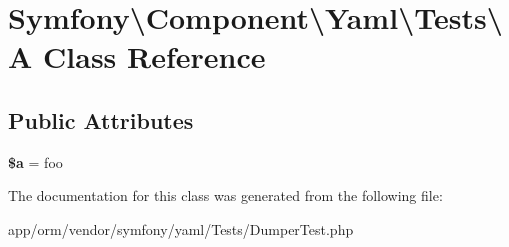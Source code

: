 \hypertarget{classSymfony_1_1Component_1_1Yaml_1_1Tests_1_1A}{}\section{Symfony\textbackslash{}Component\textbackslash{}Yaml\textbackslash{}Tests\textbackslash{}A Class Reference}
\label{classSymfony_1_1Component_1_1Yaml_1_1Tests_1_1A}
\subsection*{Public Attributes}
\begin{DoxyCompactItemize}
\item 
{\bfseries \$a} = \textquotesingle{}foo\textquotesingle{}\hypertarget{classSymfony_1_1Component_1_1Yaml_1_1Tests_1_1A_a03c15403b3822fee8c2a8013351715c0}{}\label{classSymfony_1_1Component_1_1Yaml_1_1Tests_1_1A_a03c15403b3822fee8c2a8013351715c0}

\end{DoxyCompactItemize}


The documentation for this class was generated from the following file\+:\begin{DoxyCompactItemize}
\item 
app/orm/vendor/symfony/yaml/\+Tests/Dumper\+Test.\+php\end{DoxyCompactItemize}
